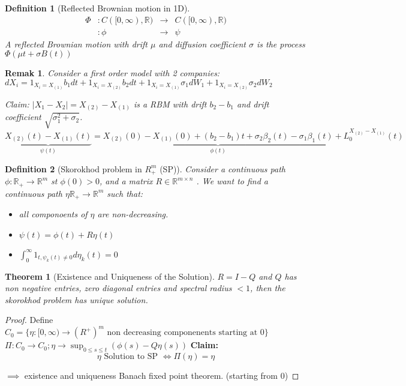 \documentclass{article} \usepackage[utf8]{inputenc}
\newtheorem{theorem}{Theorem}
\newtheorem{definition}{Definition}
\newtheorem{remark}{Remak}
\begin{document}
  \begin{definition}[Reflected Brownian motion in 1D]
    \begin{align*}
      \Phi & : C([0, \infty), \mathbb R) &\longrightarrow &C([0, \infty), \mathbb R)\\
           & : \phi &\longrightarrow & \psi 
    \end{align*}
    A reflected Brownian motion with drift $\mu$ and diffusion coefficient $\sigma$ is the process $\Phi(\mu t + \sigma B(t))$
  \end{definition}
  \begin{remark}

    Consider a first order model with 2 companies:
    $dX_i = 1_{X_i = X_(1)} b_1 dt + 1_{X_i = X_(2)} b_2 dt + 1_{X_i = X_(1)} \sigma_1 dW_1 + 1_{X_i = X_(2)} \sigma_2 dW_2$

    Claim: $|X_1 - X_2| = X_{(2)} - X_{(1)}$ is a RBM with drift $b_2 - b_1$ and drift coefficient $\sqrt{\sigma_1^2 + \sigma_2}$.
    $\underbrace{X_{(2)}(t) - X_{(1)}(t)}_{\psi(t)} = \underbrace{X_{(2)}(0) - X_{(1)}(0) + (b_2 - b_1)t + \sigma_2 \beta_2(t) - \sigma_1 \beta_1(t)}_{\phi(t)} + L_0^{X_{(2)} - X_{(1)}}(t)$
    
  \end{remark}
  \begin{definition}[Skorokhod problem in $R_+^m$ (SP)]
    Consider a continuous path $\phi: \mathbb R_+ \rightarrow \mathbb R^m$ st $\phi(0) > 0$, and a matrix $R \in \mathbb R^{m \times n}$
    . We want to find a continuous path $\eta \mathbb R_+ \rightarrow \mathbb R^m$ such that:
    \begin{itemize}
    \item all componoents of $\eta$ are non-decreasing.
    \item $\psi(t) = \phi(t) + R \eta(t)$
    \item  $\int_0^{\infty} 1_{t, \psi_k(t) \ne 0} d\eta_k(t) = 0$
    \end{itemize}
  \end{definition}
  \begin{theorem}[Existence and Uniqueness of the Solution]
    $R = I - Q$ and $Q$ has non negative entries, zero diagonal entries and spectral radius $<1$, then the skorokhod problem has unique solution. 
  \end{theorem}
  \begin{proof}
    Define $C_0 = \{ \eta: [0, \infty) \rightarrow (R^+)^m \text{ non decreasing componenents starting at } 0\}$
    $\Pi: C_0 \rightarrow C_0; \eta \rightarrow \sup_{0 \le s \le t} (\phi(s) - Q\eta(s))$
    \textbf{Claim:}
    $$\eta \text{ Solution to SP } \iff \Pi(\eta) = \eta$$

    $\implies$ existence and uniqueness Banach fixed point theorem. (starting from 0)
  \end{proof}
\end{document}
